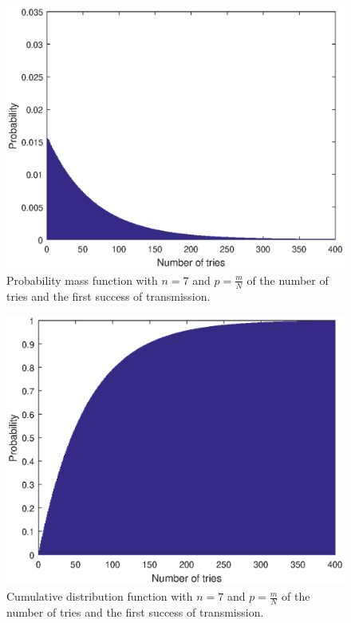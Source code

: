 		\begin{figure}[!h]
			\centering
			\includegraphics[width=\textwidth]{chapters/pmf-n=7-p=m_over_N_num_of_tries.eps}
			\caption{Probability mass function with $n = 7$ and $p = \frac{m}{N}$ of the number of tries and the first success of transmission.}
			\label{fig:pmf-n=7-num-of-tries}
		\end{figure}

		\begin{figure}[!h]
			\centering
			\includegraphics[width=\textwidth]{chapters/cdf-n=7-p=m_over_N_num_of_tries.eps}
			\caption{Cumulative distribution function with $n = 7$ and $p = \frac{m}{N}$ of the number of tries and the first success of transmission.}
			\label{fig:cdf-n=7-num-of-tries}
		\end{figure}


